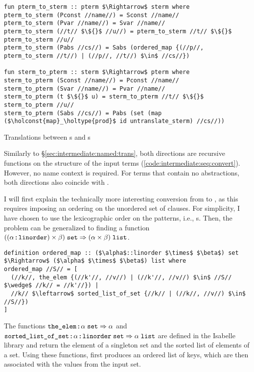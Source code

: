 \begin{code}[t]
  \begin{lstlisting}[language=Isabelle]
fun pterm_to_sterm :: pterm $\Rightarrow$ sterm where
pterm_to_sterm (Pconst //name//) = Sconst //name//
pterm_to_sterm (Pvar //name//) = Svar //name//
pterm_to_sterm (//t// $\${}$ //u//) = pterm_to_sterm //t// $\${}$ pterm_to_sterm //u//
pterm_to_sterm (Pabs //cs//) = Sabs (ordered_map {(//p//, pterm_to_sterm //t//) | (//p//, //t//) $\in$ //cs//})

fun sterm_to_pterm :: sterm $\Rightarrow$ pterm where
sterm_to_pterm (Sconst //name//) = Pconst //name//
sterm_to_pterm (Svar //name//) = Pvar //name//
sterm_to_pterm (t $\${}$ u) = sterm_to_pterm //t// $\${}$ sterm_to_pterm //u//
sterm_to_pterm (Sabs //cs//) = Pabs (set (map ($\holconst{map}_\holtype{prod}$ id untranslate_sterm) //cs//))\end{lstlisting}
  \caption{Translations between s and s}
  \label{code:intermediate:seq:convert}
\end{code}

Similarly to §\ref{sec:intermediate:named:trans}, both directions are recursive functions on the structure of the input terms (\cref{code:intermediate:seq:convert}).
However, no name context is required.
For terms that contain no abstractions, both directions also coincide with .

I will first explain the technically more interesting conversion from  to , as this requires imposing an ordering on the unordered set of clauses.
For simplicity, I have chosen to use the lexicographic order on the patterns, i.e., s.
Then, the problem can be generalized to finding a function $((\alpha \mathbin{:\!\!:} \texttt{\textup{linorder}}) \times \beta)\;\texttt{\textup{set}} \Rightarrow (\alpha \times \beta)\;\texttt{\textup{list}}$.
%
\begin{lstlisting}[language=Isabelle]
definition ordered_map :: ($\alpha$::linorder $\times$ $\beta$) set $\Rightarrow$ ($\alpha$ $\times$ $\beta$) list where
ordered_map //S// = [
  (//k//, the_elem {(//k'//, //v//) | (//k'//, //v//) $\in$ //S// $\wedge$ //k// = //k'//}) |
  //k// $\leftarrow$ sorted_list_of_set {//k// | (//k//, //v//) $\in$ //S//})
]
\end{lstlisting}
%
\noindent
The functions $\texttt{\textup{the\_elem}} \mathbin{:\!\!:} \alpha\;\texttt{\textup{set}} \Rightarrow \alpha$ and $\texttt{\textup{sorted\_list\_of\_set}} \mathbin{:\!\!:} \alpha \mathbin{:\!\!:} \texttt{\textup{linorder}}\;\texttt{\textup{set}} \Rightarrow \alpha\;\texttt{\textup{list}}$ are defined in the Isabelle library and return the element of a singleton set and the sorted list of elements of a set.
Using these functions,  first produces an ordered list of keys, which are then associated with the values from the input set.

